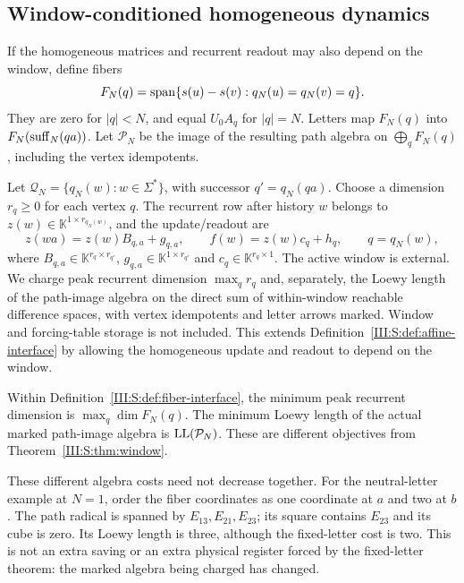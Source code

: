 \subsection{Window-conditioned homogeneous dynamics}
If the homogeneous matrices and recurrent readout may also depend on the window, define fibers
\[
 F_N(q)=\operatorname{span}\{s(u)-s(v):q_N(u)=q_N(v)=q\}.
\]
They are zero for $|q|<N$, and equal $U_0A_q$ for $|q|=N$. Letters map $F_N(q)$ into $F_N(\operatorname{suff}_N(qa))$. Let $\mathcal P_N$ be the image of the resulting path algebra on $\bigoplus_q F_N(q)$, including the vertex idempotents.

\begin{definition}
\label{III:S:def:fiber-interface}
Let $\mathcal Q_N=\{q_N(w):w\in\Sigma^*\}$, with successor
$q'=q_N(qa)$. Choose a dimension $r_q\ge0$ for each vertex $q$.
The recurrent row after history $w$ belongs to
$z(w)\in\mathbb K^{1\times r_{q_N(w)}}$, and the update/readout are
\[
 z(wa)=z(w)B_{q,a}+g_{q,a},\qquad
 f(w)=z(w)c_q+h_q,\qquad q=q_N(w),
\]
where $B_{q,a}\in\mathbb K^{r_q\times r_{q'}}$,
$g_{q,a}\in\mathbb K^{1\times r_{q'}}$ and
$c_q\in\mathbb K^{r_q\times1}$. The active window is external.
We charge peak recurrent dimension $\max_q r_q$ and, separately,
the Loewy length of the path-image algebra on the direct sum of
within-window reachable difference spaces, with vertex idempotents
and letter arrows marked. Window and forcing-table storage is not
included. This extends Definition~\ref{III:S:def:affine-interface} by
allowing the homogeneous update and readout to depend on the window.
\end{definition}

\begin{theorem}\label{III:S:thm:fiber}
Within Definition~\ref{III:S:def:fiber-interface}, the minimum peak recurrent dimension is $\max_q\dim F_N(q)$. The minimum Loewy length of the actual marked path-image algebra is $\operatorname{LL}(\mathcal P_N)$. These are different objectives from Theorem~\ref{III:S:thm:window}.
\end{theorem}

These different algebra costs need not decrease together. For the neutral-letter example at $N=1$, order the fiber coordinates as one coordinate at $a$ and two at $b$. The path radical is spanned by $E_{13},E_{21},E_{23}$; its square contains $E_{23}$ and its cube is zero. Its Loewy length is three, although the fixed-letter cost is two. This is not an extra saving or an extra physical register forced by the fixed-letter theorem: the marked algebra being charged has changed.

